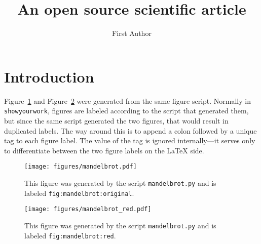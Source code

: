 \documentclass[twocolumn]{aastex631}
\begin{document}
\title{An open source scientific article}

\author{First Author}

\begin{abstract}
    \blindtext
\end{abstract}

\section{Introduction}

Figure~\ref{fig:mandelbrot:original} and Figure~\ref{fig:mandelbrot:red} were
generated from the same figure script. Normally in \texttt{showyourwork}, 
figures are labeled according to the script that generated them, but since the same
script generated the two figures, that would result in duplicated labels.
The way around this is to append a colon followed by a unique tag to each figure label.
The value of the tag is ignored internally---it serves only to differentiate between
the two figure labels on the LaTeX side.

\begin{figure}[ht!]
    \begin{centering}
        \texttt{[image: figures/mandelbrot.pdf]}
        \caption{
            This figure was generated by the script \texttt{mandelbrot.py}
            and is labeled \texttt{fig:mandelbrot:original}.
        }
        \label{fig:mandelbrot:original}
    \end{centering}
\end{figure}

\begin{figure}[ht!]
    \begin{centering}
        \texttt{[image: figures/mandelbrot\_red.pdf]}
        \caption{
            This figure was generated by the script \texttt{mandelbrot.py}
            and is labeled \texttt{fig:mandelbrot:red}.
        }
        \label{fig:mandelbrot:red}
    \end{centering}
\end{figure}
\end{document}
